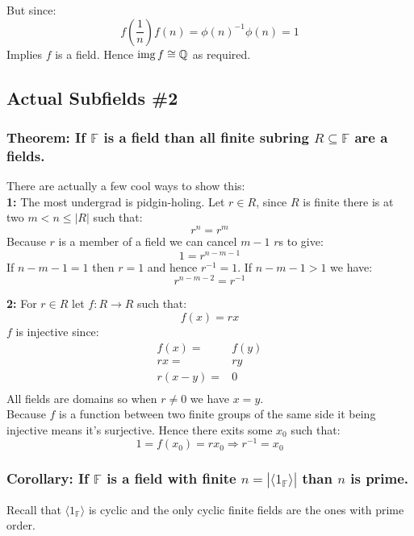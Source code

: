 But since:
\[f\left(\frac{1}{n}\right)f(n) = \phi(n)^{-1}\phi(n) = 1\]
Implies $f$ is a field.
Hence $\operatorname{img} f \cong \mathbb{Q}$ as required.

\subsection{Actual Subfields \#2}
\subsubsection{Theorem: If $\mathbb{F}$ is a field than all finite subring $R\subseteq \mathbb{F}$ are a fields.}
There are actually a few cool ways to show this:
\\

\textbf{1:} The most undergrad is pidgin-holing. 
Let $r\in R$, since
$R$ is finite there is at two $m < n \leq |R|$ such that:
\[ r^n=r^m\]
Because $r$ is a member of a field we can cancel $m-1$ $r$s to give:
\[1 = r^{n-m-1}\]
If $n-m-1 = 1$ then $r = 1$ and hence $r^{-1}=1$.
If $n-m-1 > 1$ we have:
\[r^{n-m-2} = r^{-1}\]

\textbf{2:}
For $r\in R$ let $f: R\rightarrow R$ such that:
\[f(x) = rx \]
$f$ is injective since:
\begin{equation*}
\begin{aligned}
	f(x) =& f(y) \\
	rx =& ry \\
	r(x-y) =& 0\\
\end{aligned}
\end{equation*}
All fields are domains so when $r\neq 0$ we have $x=y$.
\\

Because $f$ is a function between two finite groups of the same side it being injective means it's surjective.
Hence there exits some $x_0$ such that:
\[
	1 = f(x_0) = rx_0 \Rightarrow r^{-1} = x_0
\]

\subsubsection{Corollary: If $\mathbb{F}$ is a field with finite $n=|\langle 1_\mathbb{F} \rangle|$ than $n$ is prime.}
Recall that $\langle 1_\mathbb{F} \rangle$ is cyclic and the only cyclic finite fields are the ones with prime order.
